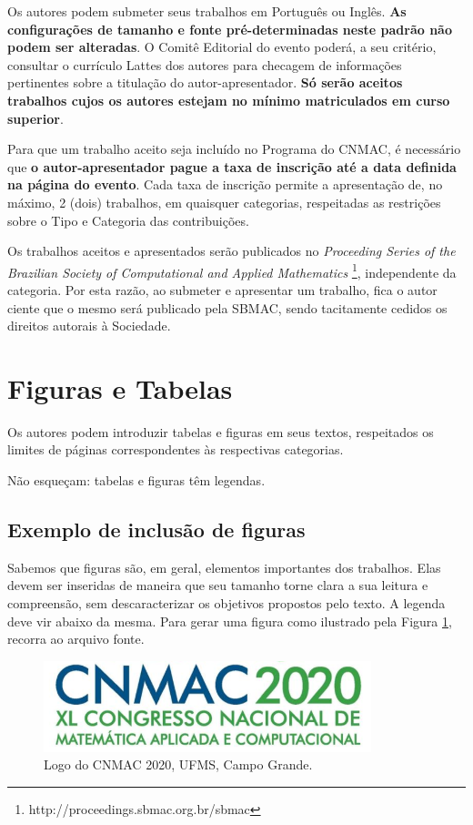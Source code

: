 \documentclass[a4,11pt]{pssbmac}
\begin{document}
Os autores podem submeter seus trabalhos em Português ou Inglês. \textbf{As configurações de tamanho e fonte pré-determinadas neste padrão não podem ser alteradas}. O Comitê Editorial do evento poderá, a seu critério, consultar o currículo Lattes dos autores para checagem de informações pertinentes sobre a titulação do autor-apresentador. {\bf Só serão aceitos trabalhos cujos os autores estejam no mínimo matriculados em curso superior}.

Para que um trabalho aceito seja incluído no Programa do CNMAC, é necessário que {\bf o autor-apresentador pague a taxa de inscrição até a data definida na página do evento}. Cada taxa de inscrição permite a apresentação de, no máximo, 2 (dois) trabalhos, em quaisquer categorias, respeitadas as  restrições sobre o Tipo e Categoria das contribuições. 

Os trabalhos aceitos e apresentados serão publicados no {\it Proceeding Series of the Brazilian Society of Computational and Applied Mathematics} \footnote{http://proceedings.sbmac.org.br/sbmac}, independente da categoria. Por esta razão, ao submeter e apresentar um trabalho, fica o autor ciente que o mesmo será publicado pela SBMAC, sendo tacitamente cedidos os direitos autorais à Sociedade.

\section{Figuras e Tabelas}\label{sec3}

Os autores podem introduzir tabelas e figuras em seus textos, respeitados os limites de páginas correspondentes às respectivas categorias.

\begin{obs}
Não esqueçam: tabelas e figuras têm legendas.
\end{obs}

\subsection{Exemplo de inclusão de figuras}

Sabemos que figuras são, em geral, elementos importantes dos trabalhos. Elas devem ser inseridas de maneira que seu tamanho torne clara a sua leitura e compreensão, sem descaracterizar os objetivos propostos pelo texto. A legenda deve vir abaixo da mesma. Para gerar uma figura como ilustrado pela Figura \ref{figura01}, recorra ao arquivo fonte. 

\begin{figure}[h]
\centering
\includegraphics[width=.5\textwidth]{logo_cnmac_2020}
\caption{ {\small Logo do CNMAC 2020, UFMS, Campo Grande.}}
\label{figura01}
\end{figure}
\end{document}
